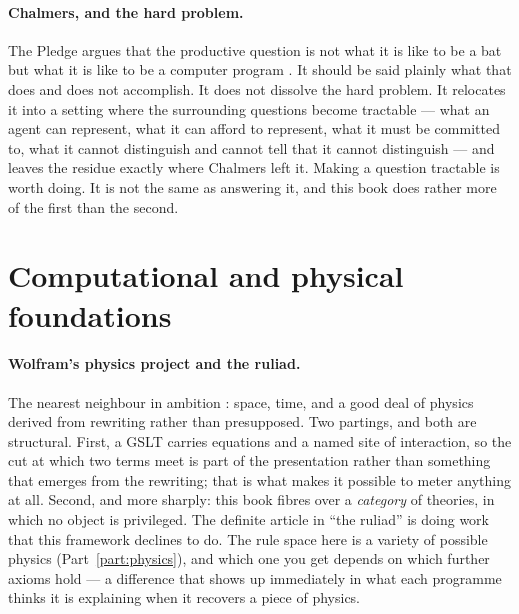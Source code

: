 \paragraph{Chalmers, and the hard problem.}
The Pledge argues that the productive question is not what it is
like to be a bat but what it is like to be a computer program
\cite{nagel1974,chalmers1996}.
It should be said plainly what that does and does not accomplish.
It does not dissolve the hard problem.
It relocates it into a setting where the surrounding questions
become tractable --- what an agent can represent, what it can
afford to represent, what it must be committed to, what it cannot
distinguish and cannot tell that it cannot distinguish --- and
leaves the residue exactly where Chalmers left it.
Making a question tractable is worth doing.
It is not the same as answering it, and this book does rather more
of the first than the second.

\section*{Computational and physical foundations}

\paragraph{Wolfram's physics project and the ruliad.}
The nearest neighbour in ambition \cite{wolfram2020,wolfram2021}:
space, time, and a good deal of physics derived from rewriting
rather than presupposed.
Two partings, and both are structural.
First, a GSLT carries equations and a named site of interaction, so
the cut at which two terms meet is part of the presentation rather
than something that emerges from the rewriting; that is what makes
it possible to meter anything at all.
Second, and more sharply: this book fibres over a \emph{category}
of theories, in which no object is privileged.
The definite article in ``the ruliad'' is doing work that this
framework declines to do.
The rule space here is a variety of possible physics
(Part~\ref{part:physics}), and which one you get depends on which
further axioms hold --- a difference that shows up immediately in
what each programme thinks it is explaining when it recovers a
piece of physics.

